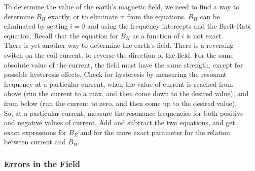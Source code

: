 \documentclass{../lab}
\begin{document}
To determine the value of the earth's magnetic field, we need to find a way to determine $B_{H}$ exactly, or to eliminate it from the equations. $B_{H}$ can be eliminated by setting $i = 0$ and using the frequency intercepts and the Breit-Rabi equation. Recall that the equation for $B_{H}$ as a function of $i$ is not exact. \\

There is yet another way to determine the earth's field. There is a reversing switch on the coil current, to reverse the direction of the field. For the same absolute value of the current, the field must have the same strength, except for possible hysteresis effects. Check for hysteresis by measuring the resonant frequency at a particular current, when the value of current is reached from above (run the current to a max, and then come down to the desired value), and from below (run the current to zero, and then come up to the desired value). \\

So, at a particular current, measure the resonance frequencies for both positive and negative values of current. Add and subtract the two equations, and get exact expressions for $B_{E}$ and for the more exact parameter for the relation between current and $B_{H}$.

\subsubsection{Errors in the Field}
\end{document}
